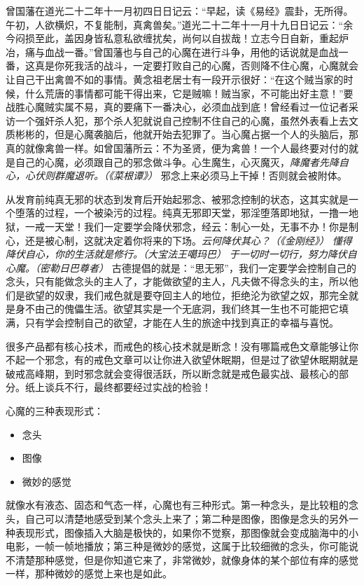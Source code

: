 曾国藩在道光二十二年十一月初四日日记云：“早起，读《易经》震卦，无所得。午初，人欲横炽，不复能制，真禽兽矣。”道光二十二年十一月十九日日记云：“余今闷损至此，盖因身皆私意私欲缠扰矣，尚何以自拔哉！立志今日自新，重起炉冶，痛与血战一番。”曾国藩也与自己的心魔在进行斗争，用他的话说就是血战一番，这真是你死我活的战斗，一定要打败自己的心魔，否则降不住心魔，心魔就会让自己干出禽兽不如的事情。黄念祖老居士有一段开示很好：“在这个贼当家的时候，什么荒唐的事情都可能干得出来，它是贼嘛！贼当家，不可能出好主意！”要战胜心魔贼实属不易，真的要痛下一番决心，必须血战到底！曾经看过一位记者采访一个强奸杀人犯，那个杀人犯就说自己控制不住自己的心魔，虽然外表看上去文质彬彬的，但是心魔袭脑后，他就开始去犯罪了。当心魔占据一个人的头脑后，那真的就像禽兽一样。如曾国藩所云：不为圣贤，便为禽兽！一个人最终要对付的就是自己的心魔，必须跟自己的邪念做斗争。心生魔生，心灭魔灭，\textit{降魔者先降自心，心伏则群魔退听。（《菜根谭》）} 邪念上来必须马上干掉！否则就会被附体。

从发育前纯真无邪的状态到发育后开始起邪念、被邪念控制的状态，这其实就是一个堕落的过程，一个被染污的过程。纯真无邪即天堂，邪淫堕落即地狱，一撸一地狱，一戒一天堂！我们一定要学会降伏邪念，经云：制心一处，无事不办！你是制心，还是被心制，这就决定着你将来的下场。\textit{云何降伏其心？（《金刚经》）} \textit{懂得降伏自心，你的生活就是修行。（大宝法王噶玛巴）} \textit{于一切时一切行，努力降伏自心魔。（密勒日巴尊者）} 古德提倡的就是：“思无邪”，我们一定要学会控制自己的念头，只有能做念头的主人了，才能做欲望的主人，凡夫做不得念头的主，所以他们是欲望的奴隶，我们戒色就是要夺回主人的地位，拒绝沦为欲望之奴，那完全就是身不由己的傀儡生活。欲望其实是一个无底洞，我们终其一生也不可能把它填满，只有学会控制自己的欲望，才能在人生的旅途中找到真正的幸福与喜悦。

很多产品都有核心技术，而戒色的核心技术就是断念！没有哪篇戒色文章能够让你不起一个邪念，有的戒色文章可以让你进入欲望休眠期，但是过了欲望休眠期就是破戒高峰期，到时邪念就会变得很活跃，所以断念就是戒色最实战、最核心的部分。纸上谈兵不行，最终都要经过实战的检验！

心魔的三种表现形式：

\begin{multicols}{3}
    \begin{itemize}
        \item 念头
        \item 图像
        \item 微妙的感觉
    \end{itemize}
\end{multicols}

就像水有液态、固态和气态一样，心魔也有三种形式。第一种念头，是比较粗的念头，自己可以清楚地感受到某个念头上来了；第二种是图像，图像是念头的另外一种表现形式，图像插入大脑是极快的，如果你不觉察，那图像就会变成脑海中的小电影，一帧一帧地播放；第三种是微妙的感觉，这属于比较细微的念头，你可能说不清楚那种感觉，但是你知道它来了，非常微妙，就像身体的某个部位有痒的感觉一样，那种微妙的感觉上来也是如此。

